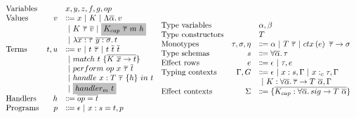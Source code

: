 \documentclass[acmsmall,review,screen]{acmart}
\newcommand{\graybox}[1]{\colorbox{lightgray}{$\displaystyle #1$}}
\newcommand{\vor}{~|~}
\newcommand{\ap}{~}
\newcommand{\ctx}[1]{ctx\left(#1\right)~}
\begin{document}
\begin{figure}
    \centering
    \begin{gather*}
        \begin{array}{lrll}
            \text{Variables} & & x, y, z, f, g, op \\
            \text{Values} &v &\Coloneqq x \vor K \vor \Lambda \overline{\alpha} \ldotp v \\
            &&\vor K\ap \overline{\tau} \ap \overline{v} \vor \graybox{K_{cap}\ap\overline{\tau}\ap m\ap h} \\
            &&\vor \lambda \overline{x : \tau}~\overline{y : \sigma}\ldotp t
            \\
            \text{Terms} &t, u &\Coloneqq v \vor t\ap\overline{\tau} \vor t \ap \overline{t} \ap \overline{t} \\
            &&\vor match ~ t ~\{\overline{K \ap \overline{x} \to t}\} \\
            &&\vor perform ~ op \ap x \ap \overline{\tau} \ap \overline{t} \\
            &&\vor handle ~ x : T \ap \overline{\tau} ~ \{h\}~in ~t \\
            &&\vor \graybox{handler_m ~ t}
            \\
            \text{Handlers} &h &\Coloneqq \overline{op = t}
            \\
            \text{Programs} &p &\Coloneqq \epsilon \vor x : s = t, p
        \end{array}
        \begin{array}{lrl}
            \text{Type variables} && \alpha, \beta \\
            \text{Type constructors} && T \\
            \text{Monotypes} & \tau, \sigma, \eta &\Coloneqq \alpha \vor T \ap \overline{\tau} \vor \ctx{e} \overline{\tau} \to \sigma \\
            \text{Type schemas} & s &\Coloneqq \forall\overline{\alpha}\ldotp \tau \\
            \text{Effect rows} & e &\Coloneqq \epsilon\vor \tau, e \\
            \text{Typing contexts} & \Gamma, G &\Coloneqq \epsilon \vor x : s, \Gamma \vor x :_c \tau, \Gamma \\
            &&\vor K : \forall\overline{\alpha}\ldotp \overline{\tau}\to T\ap \overline{\alpha}, \Gamma \\
            \text{Effect contexts} & \Sigma &\Coloneqq \{\overline{K_{cap} : \forall\overline{\alpha}\ldotp sig\to T\ap\overline{\alpha}}\} \\

\end{array}
\end{gather*}
\end{figure}
\end{document}
